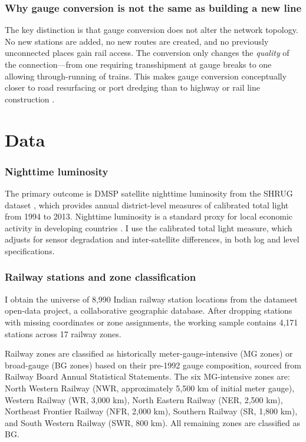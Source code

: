 \documentclass[12pt]{article}
\begin{document}
\subsubsection*{Why gauge conversion is not the same as building a new line} The key distinction is that gauge conversion does not alter the network topology. No new stations are added, no new routes are created, and no previously unconnected places gain rail access. The conversion only changes the \emph{quality} of the connection---from one requiring transshipment at gauge breaks to one allowing through-running of trains. This makes gauge conversion conceptually closer to road resurfacing or port dredging than to highway or rail line construction \citep{duranton2014urban}.

\section{Data}
\label{sec:data}

\subsubsection*{Nighttime luminosity} The primary outcome is DMSP satellite nighttime luminosity from the SHRUG dataset \citep{asher2021shrug}, which provides annual district-level measures of calibrated total light from 1994 to 2013. Nighttime luminosity is a standard proxy for local economic activity in developing countries \citep{henderson2012measuring, michalopoulos2013pre}. I use the calibrated total light measure, which adjusts for sensor degradation and inter-satellite differences, in both log and level specifications.

\subsubsection*{Railway stations and zone classification} I obtain the universe of 8,990 Indian railway station locations from the datameet open-data project, a collaborative geographic database. After dropping stations with missing coordinates or zone assignments, the working sample contains 4,171 stations across 17 railway zones.

Railway zones are classified as historically meter-gauge-intensive (MG zones) or broad-gauge (BG zones) based on their pre-1992 gauge composition, sourced from Railway Board Annual Statistical Statements. The six MG-intensive zones are: North Western Railway (NWR, approximately 5,500 km of initial meter gauge), Western Railway (WR, 3,000 km), North Eastern Railway (NER, 2,500 km), Northeast Frontier Railway (NFR, 2,000 km), Southern Railway (SR, 1,800 km), and South Western Railway (SWR, 800 km). All remaining zones are classified as BG.
\end{document}
